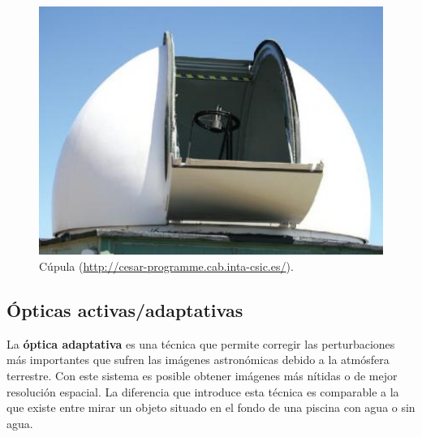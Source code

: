 \bigskip
\begin{figure}[!ht]
  \begin{center}
  \includegraphics[width=1\textwidth]{../images/cupula.jpg}
  \caption{Cúpula (\url{http://cesar-programme.cab.inta-csic.es/}).}
  \label{fig:diag_scrum}
  \end{center}
\end{figure}

\subsection{Ópticas activas/adaptativas}

La \textbf{óptica adaptativa} es una técnica que permite corregir las perturbaciones más importantes que sufren las imágenes astronómicas debido a la atmósfera terrestre. Con este sistema es posible obtener imágenes más nítidas o de mejor resolución espacial. La diferencia que introduce esta técnica es comparable a la que existe entre mirar un objeto situado en el fondo de una piscina con agua o sin agua.


